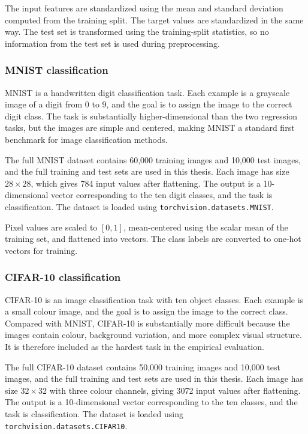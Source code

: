 The input features are standardized using the mean and standard deviation computed from the training split. The target values are standardized in the same way. The test set is transformed using the training-split statistics, so no information from the test set is used during preprocessing.

\subsubsection{MNIST classification}

MNIST is a handwritten digit classification task. Each example is a grayscale image of a digit from 0 to 9, and the goal is to assign the image to the correct digit class. The task is substantially higher-dimensional than the two regression tasks, but the images are simple and centered, making MNIST a standard first benchmark for image classification methods.

The full MNIST dataset contains 60,000 training images and 10,000 test images, and the full training and test sets are used in this thesis. Each image has size \(28\times28\), which gives 784 input values after flattening. The output is a 10-dimensional vector corresponding to the ten digit classes, and the task is classification. The dataset is loaded using \texttt{torchvision.datasets.MNIST}.

Pixel values are scaled to \([0,1]\), mean-centered using the scalar mean of the training set, and flattened into vectors. The class labels are converted to one-hot vectors for training.

\subsubsection{CIFAR-10 classification}

CIFAR-10 is an image classification task with ten object classes. Each example is a small colour image, and the goal is to assign the image to the correct class. Compared with MNIST, CIFAR-10 is substantially more difficult because the images contain colour, background variation, and more complex visual structure. It is therefore included as the hardest task in the empirical evaluation.

The full CIFAR-10 dataset contains 50,000 training images and 10,000 test images, and the full training and test sets are used in this thesis. Each image has size \(32\times32\) with three colour channels, giving 3072 input values after flattening. The output is a 10-dimensional vector corresponding to the ten classes, and the task is classification. The dataset is loaded using \texttt{torchvision.datasets.CIFAR10}.

